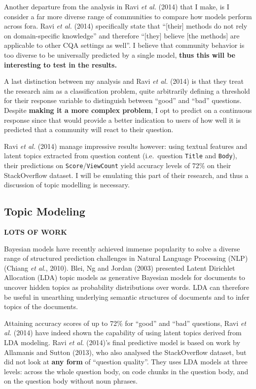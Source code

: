 \documentclass[11pt,preprint, authoryear]{article}
\numberwithin{equation}{section}
\begin{document}
Another departure from the analysis in Ravi \emph{et al.} (2014) that I
make, is I consider a far more diverse range of communities to compare
how models perform across fora. Ravi \emph{et al.} (2014) specifically
state that ``{[}their{]} methods do not rely on domain-specific
knowledge'' and therefore ``{[}they{]} believe {[}the methods{]} are
applicable to other CQA settings as well''. I believe that community
behavior is too diverse to be universally predicted by a single model,
\textbf{thus this will be interesting to test in the results.}

A last distinction between my analysis and Ravi \emph{et al.} (2014) is
that they treat the research aim as a classification problem, quite
arbitrarily defining a threshold for their response variable to
distinguish between ``good'' and ``bad'' questions. Despite
\textbf{making it a more complex problem}, I opt to predict on a
continuous response since that would provide a better indication to
users of how well it is predicted that a community will react to their
question.

Ravi \emph{et al.} (2014) manage impressive results however: using
textual features and latent topics extracted from question content
(i.e.~question \texttt{Title} and \texttt{Body}), their predictions on
\texttt{Score}/\texttt{ViewCount} yield accuracy levels of 72\% on their
StackOverflow dataset. I will be emulating this part of their research,
and thus a discussion of topic modelling is necessary.

\subsection{\texorpdfstring{Topic Modeling
\label{model_lit}}{Topic Modeling }}\label{topic-modeling}

\textbf{LOTS OF WORK}

Bayesian models have recently achieved immense popularity to solve a
diverse range of structured prediction challenges in Natural Language
Processing (NLP) (Chiang \emph{et al.}, 2010). Blei, Ng and Jordan
(2003) presented Latent Dirichlet Allocation (LDA) topic models as
generative Bayesian models for documents to uncover hidden topics as
probability distributions over words. LDA can therefore be useful in
unearthing underlying semantic structures of documents and to infer
topics of the documents.

Attaining accuracy scores of up to 72\% for ``good'' and ``bad''
questions, Ravi \emph{et al.} (2014) have indeed shown the capability of
using latent topics derived from LDA modeling. Ravi \emph{et al.}
(2014)'s final predictive model is based on work by Allamanis and Sutton
(2013), who also analysed the StackOverflow dataset, but did not look at
\textbf{any form} of ``question quality''. They uses LDA models at three
levels: across the whole question body, on code chunks in the question
body, and on the question body without noun phrases.
\end{document}
